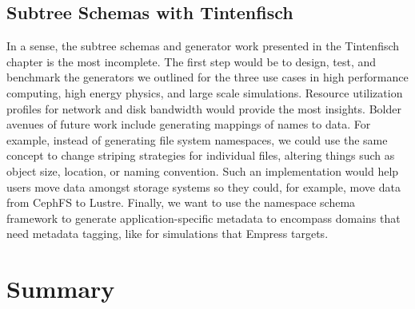 








\subsection{Subtree Schemas with Tintenfisch}

In a sense, the subtree schemas and generator work presented in the Tintenfisch
chapter is the most incomplete. The first step would be to design, test, and
benchmark the generators we outlined for the three use cases in high
performance computing, high energy physics, and large scale simulations.
Resource utilization profiles for network and disk bandwidth would provide the
most insights. Bolder avenues of future work include generating mappings of
names to data. For example, instead of generating file system namespaces, we
could use the same concept to change striping strategies for individual files,
altering things such as object size, location, or naming convention. Such an
implementation would help users move data amongst storage systems so they
could, for example, move data from CephFS to Lustre. Finally, we want to use
the namespace schema framework to generate application-specific metadata to
encompass domains that need metadata tagging, like for simulations that Empress
targets.

\section{Summary}

